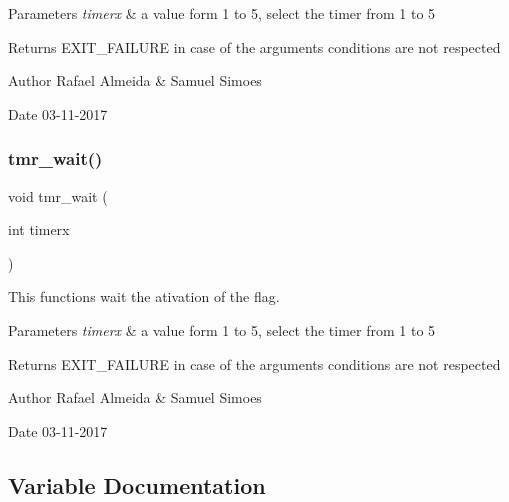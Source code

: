 \begin{DoxyParams}{Parameters}
{\em timerx} & a value form 1 to 5, select the timer from 1 to 5 \\
\hline
\end{DoxyParams}
\begin{DoxyReturn}{Returns}
E\+X\+I\+T\+\_\+\+F\+A\+I\+L\+U\+RE in case of the argument\textquotesingle{}s conditions are not respected 
\end{DoxyReturn}
\begin{DoxyAuthor}{Author}
Rafael Almeida \& Samuel Simoes 
\end{DoxyAuthor}
\begin{DoxyDate}{Date}
03-\/11-\/2017 
\end{DoxyDate}
\mbox{\label{timer__libs_8c_a303cd7354e05d6a9cb43021b28a37fc5}} 
\subsubsection{tmr\+\_\+wait()}
{\footnotesize\ttfamily void tmr\+\_\+wait (\begin{DoxyParamCaption}\item[{int}]{timerx }\end{DoxyParamCaption})}



This functions wait the ativation of the flag. 


\begin{DoxyParams}{Parameters}
{\em timerx} & a value form 1 to 5, select the timer from 1 to 5\\
\hline
\end{DoxyParams}
\begin{DoxyReturn}{Returns}
E\+X\+I\+T\+\_\+\+F\+A\+I\+L\+U\+RE in case of the argument\textquotesingle{}s conditions are not respected 
\end{DoxyReturn}
\begin{DoxyAuthor}{Author}
Rafael Almeida \& Samuel Simoes 
\end{DoxyAuthor}
\begin{DoxyDate}{Date}
03-\/11-\/2017 
\end{DoxyDate}


\subsection{Variable Documentation}
\mbox{\label{timer__libs_8c_a20150e614e0db063b5a978ffa74ec1f3}} 
